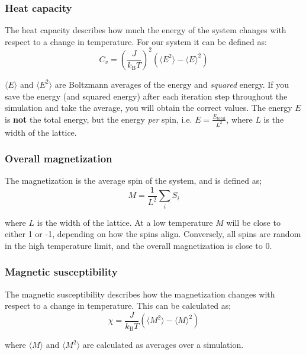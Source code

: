\documentclass{article}
\begin{document}
\subsubsection{Heat capacity}

The heat capacity describes how much the energy of the system changes with respect to
a change in temperature. For our system it can be defined as:
\begin{equation}
C_v = \left( \frac{J}{k_{\mathrm{B}}T} \right)^2 \left( \langle E^2 \rangle - \langle E \rangle^2 \right)
\end{equation}

$\langle E \rangle$
and $\langle E^2 \rangle$ are Boltzmann averages of the energy
and \textit{squared} energy.
If you save the energy (and squared energy) after each iteration step throughout
the simulation and take the average, you will obtain the correct values.
The energy $E$ is \textbf{not} the total energy, but the
energy \textit{per} spin, i.e. $E = \frac{E_\mathrm{total}}{L^2}$,
where $L$ is the width of the lattice.

\subsubsection{Overall magnetization}

The magnetization is the average spin of the system, and is defined as;
\begin{equation}
M =\frac{1}{L^2} \sum_i S_i
\end{equation}

where $L$ is the width of the lattice.
At a low temperature $M$ will be close to either 1 or -1,
depending on how the spins align.
Conversely, all spins are random in the high temperature limit, and
the overall magnetization is close to 0.

\subsubsection{Magnetic susceptibility}
The magnetic susceptibility describes how the magnetization changes with respect to a change in temperature.
This can be calculated as;
\begin{equation}
\chi = \frac{J}{k_{\mathrm{B}}T} \left( \langle M^2 \rangle - \langle M \rangle^2 \right)
\end{equation}

where $\langle M \rangle$ and $\langle M^2 \rangle$ are calculated as averages over a simulation.
\end{document}
